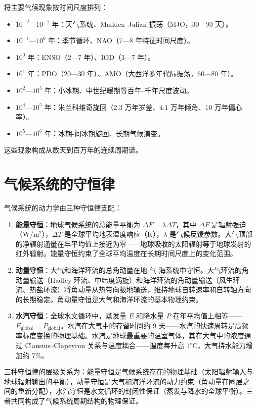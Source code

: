 \begin{remark}[气候现象的周期谱]
将主要气候现象按时间尺度排列：
\begin{itemize}
    \item $10^{-2}$—$10^{-1}$ 年：天气系统、Madden–Julian 振荡（MJO，$30$—$90$ 天）。
    \item $10^{-1}$—$10^0$ 年：季节循环、NAO（$7$—$8$ 年特征时间尺度）。
    \item $10^0$ 年：ENSO（$2$—$7$ 年）、IOD（$3$—$7$ 年）。
    \item $10^1$ 年：PDO（$20$—$30$ 年）、AMO（大西洋多年代际振荡，$60$—$80$ 年）。
    \item $10^2$—$10^3$ 年：小冰期、中世纪暖期等百年–千年尺度波动。
    \item $10^4$—$10^5$ 年：米兰科维奇旋回（$2.3$ 万年岁差、$4.1$ 万年倾角、$10$ 万年偏心率）。
    \item $10^5$—$10^6$ 年：冰期-间冰期旋回、长期气候演变。
\end{itemize}
这些现象构成从数天到百万年的连续周期谱。
\end{remark}

\section{气候系统的守恒律}

\begin{theorem}[气候系统的三种守恒律]\label{thm:climate_conservation}
气候系统的动力学由三种守恒律支配：
\begin{enumerate}[label=(\roman*)]
    \item \textbf{能量守恒}：地球气候系统的总能量平衡为 $\Delta F = \lambda \Delta T$，其中 $\Delta F$ 是辐射强迫（W/m$^2$），$\Delta T$ 是全球平均地表温度响应（K），$\lambda$ 是气候反馈参数。大气顶部的净辐射通量在年平均值上接近为零——地球吸收的太阳辐射等于地球发射的红外辐射。能量守恒约束了全球平均温度在长期时间尺度上的变化范围。
    \item \textbf{动量守恒}：大气和海洋环流的总角动量在地-气-海系统中守恒。大气环流的角动量输送（Hadley 环流、中纬度涡旋）和海洋环流的角动量输送（风生环流、热盐环流）将角动量从热带向极地输送，维持地球自转速率和自转轴方向的长期稳定。角动量守恒是大气和海洋环流的基本物理约束。
    \item \textbf{水汽守恒}：全球水文循环中，蒸发量 $E$ 和降水量 $P$ 在年平均值上相等——$E_{\text{global}} = P_{\text{global}}$。水汽在大气中的存留时间约 $9$ 天——水汽的快速周转是高频率标度变换的物理基础。水汽是地球最重要的温室气体，其在大气中的浓度通过 Clausius–Clapeyron 关系与温度耦合——温度每升高 $1^\circ$C，大气持水能力增加约 $7\%$。
\end{enumerate}
三种守恒律的层级关系为：能量守恒是气候系统存在的物理基础（太阳辐射输入与地球辐射输出的平衡），动量守恒是大气和海洋环流的动力约束（角动量在圈层之间的重新分配），水汽守恒是水文循环的封闭性保证（蒸发与降水的全球平衡）。三者共同构成了气候系统周期结构的物理保证。
\end{theorem}

